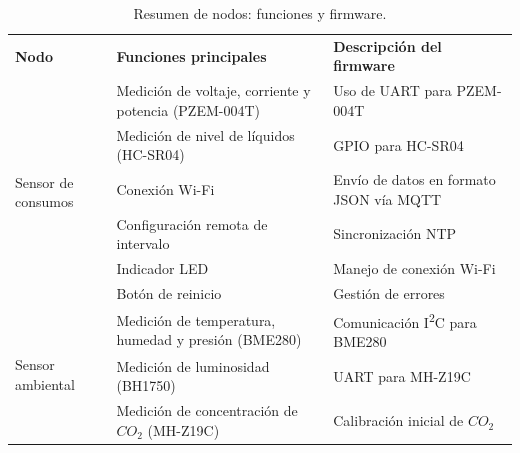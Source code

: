 \begin{table}[H]
    \centering
    \caption[Resumen de nodos]{Resumen de nodos: funciones y firmware.}
    \begin{tabular}{p{1.5cm}p{5.4cm}p{5.5cm}}
        \hline
        \textbf{Nodo}                                     & \textbf{Funciones principales}                                                & \textbf{Descripción del firmware}              \\
        \multirow{6}{1.5cm}{Sensor de consumos}           & Medición de voltaje, corriente y potencia (PZEM-004T)                         & Uso de UART para PZEM-004T                     \\
                                                          & Medición de nivel de líquidos (HC-SR04)                                       & GPIO para HC-SR04                              \\
                                                          & Conexión Wi-Fi                                                                & Envío de datos en formato JSON vía MQTT        \\
                                                          & Configuración remota de intervalo                                             & Sincronización NTP                             \\
                                                          & Indicador LED                                                                 & Manejo de conexión Wi-Fi                       \\
                                                          & Botón de reinicio                                                             & Gestión de errores                             \\
        \hline
        \multirow{7}{1.5cm}{Sensor ambiental}             & Medición de temperatura, humedad y presión (BME280)                           & Comunicación I\textsuperscript{2}C para BME280 \\
                                                          & Medición de luminosidad (BH1750)                                              & UART para MH-Z19C                              \\
                                                          & Medición de concentración de $CO_2$ (MH-Z19C)                                 & Calibración inicial de $CO_2$                  \\

\end{tabular}
\end{table}
